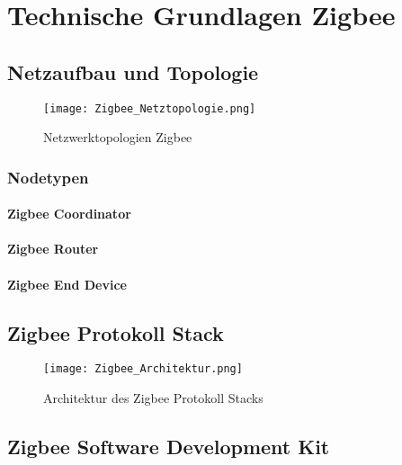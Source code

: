 \clearpage
\section{Technische Grundlagen Zigbee}\label{sec:TechnischeGrundlagenZigbee}

\subsection{Netzaufbau und Topologie}\label{subsec:NetzaufbauundTopologie}

\begin{figure}[h]
	\centering
	\texttt{[image: Zigbee\_Netztopologie.png]}
	\caption{Netzwerktopologien Zigbee}
	\label{fig:NetzwerktopologienZigbee}
\end{figure}

\subsubsection{Nodetypen}\label{subsubsec:Nodetypen}
\paragraph{Zigbee Coordinator}\label{para:ZigbeeCoordinator}

\paragraph{Zigbee Router}\label{para:ZigbeeRouter}

\paragraph{Zigbee End Device}\label{para:ZigbeeEndDevice}





\subsection{Zigbee Protokoll Stack}\label{subsec:ZigbeeProtokollStack}

\begin{figure}[h]
	\centering
	\texttt{[image: Zigbee\_Architektur.png]}
	\caption{Architektur des Zigbee Protokoll Stacks}
	\label{fig:ArchitekturdesZigbeeProtokollStacks}
\end{figure}

\subsection{Zigbee Software Development Kit}\label{subsec:ZigbeeSoftwareDevelopmentKit}
